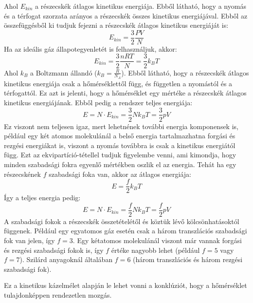 \documentclass[../main.tex]{subfiles}
\begin{document}
Ahol $E_{kin}$ a részecskék átlagos kinetikus energiája. Ebből látható, hogy a nyomás és a térfogat szorzata arányos a részecskék összes kinetikus energiájával. Ebből az összefüggésből ki tudjuk fejezni a részecskék átlagos kinetikus energiáját is:
\begin{equation}
    E_{kin} = \frac{3}{2} \frac{P V}{N}
\end{equation}
Ha az ideális gáz állapotegyenletét is felhasználjuk, akkor:
\begin{equation}
    E_{kin} = \frac{3}{2} \frac{n R T}{N} = \frac{3}{2} k_B T
\end{equation}
Ahol $k_B$ a Boltzmann állandó ($k_B = \frac{R}{N_A}$). Ebből látható, hogy a részecskék átlagos kinetikus energiája csak a hőmérséklettől függ, és független a nyomástól és a térfogattól. Ez azt is jelenti, hogy a hőmérséklet egy mértéke a részecskék átlagos kinetikus energiájának.
Ebből pedig a rendszer teljes energiája:
\begin{equation}
    E = N \cdot E_{kin} = \frac{3}{2} N k_B T = \frac{3}{2} pV
\end{equation}
Ez viszont nem teljesen igaz, mert lehetnének további energia komponensek is, például egy két atomos molekulánál a belső energia tartalmazhatna forgási és rezgési energiákat is, viszont a nyomás továbbra is csak a kinetikus energiától függ.
Ezt az ekvipartíció-tétellel tudjuk figyelembe venni, ami kimondja, hogy minden szabadsági fokra egyenlő mértékben oszlik el az energia. Tehát ha egy részecskének $f$ szabadsági foka van, akkor az átlagos energiája:
\begin{equation}
    E = \frac{f}{2} k_B T
\end{equation}
Így a teljes energia pedig:
\begin{equation}
    E = N \cdot E_{kin} = \frac{f}{2} N k_B T = \frac{f}{2} pV
\end{equation}
A szabadsági fokok a részecskék összetételétől és köztük lévő kölcsönhatásoktól függenek. Például egy egyatomos gáz esetén csak a három transzlációs szabadsági fok van jelen, így $f = 3$. Egy kétatomos molekulánál viszont már vannak forgási és rezgési szabadsági fokok is, így $f$ értéke nagyobb lehet (például $f = 5$ vagy $f = 7$). 
Szilárd anyagoknál általában $f = 6$ (három transzlációs és három rezgési szabadsági fok).

Ez a kinetikus kázelmélet alapján le lehet vonni a konklúziót, hogy a hőmérséklet tulajdonképpen rendezetlen mozgás.
\end{document}
